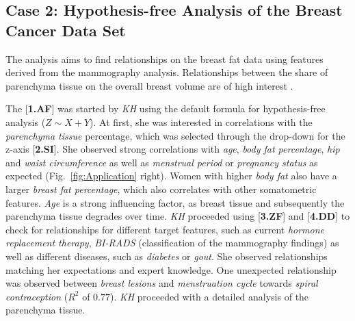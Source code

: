 \documentclass[journal]{style/vgtc} 			          %
\begin{document}
\subsection{Case 2: Hypothesis-free Analysis of the Breast Cancer Data Set}
The analysis aims to find relationships on the breast fat data using features derived from the mammography analysis.
Relationships between the share of parenchyma tissue on the overall breast volume are of high interest \cite{Mccormack2006}.

The [\textbf{1.AF}] was started by \emph{KH} using the default formula for hypothesis-free analysis ($Z \sim X + Y$).
At first, she was interested in correlations with the \emph{parenchyma tissue} percentage, which was selected through the drop-down for the z-axis [\textbf{2.SI}].
She observed strong correlations with \emph{age}, \emph{body fat percentage}, \emph{hip} and \emph{waist circumference} as well as \emph{menstrual period} or \emph{pregnancy status} as expected (Fig.~\ref{fig:Application} right).
Women with higher \emph{body fat} also have a larger \emph{breast fat percentage}, which also correlates with other somatometric features.
\emph{Age} is a strong influencing factor, as breast tissue and subsequently the parenchyma tissue degrades over time.
\emph{KH} proceeded using [\textbf{3.ZF}] and [\textbf{4.DD}] to check for relationships for different target features, such as current \emph{hormone replacement therapy}, \emph{BI-RADS} (classification of the mammography findings) as well as different diseases, such as \emph{diabetes} or \emph{gout}.
She observed relationships matching her expectations and expert knowledge.
One unexpected relationship was observed between \emph{breast lesions} and \emph{menstruation cycle} towards \emph{spiral contraception} ($R^2$ of $0.77$).
\emph{KH} proceeded with a detailed analysis of the parenchyma tissue.
\end{document}
